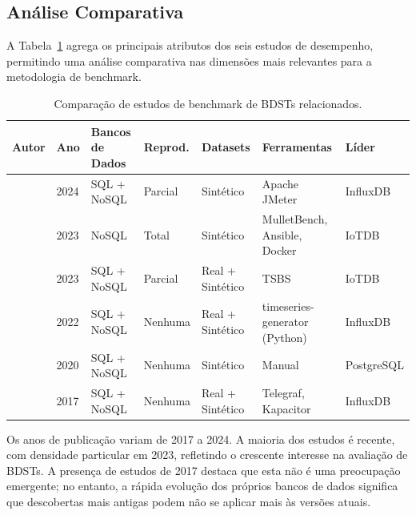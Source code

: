 \subsection{Análise Comparativa}

A Tabela~\ref{tab:related} agrega os principais atributos dos seis estudos de desempenho,
permitindo uma análise comparativa nas dimensões mais relevantes para a metodologia de
benchmark.

\begin{table}[t]
  \centering
  \footnotesize
  \caption{Comparação de estudos de benchmark de BDSTs relacionados.}
  \label{tab:related}
  \begin{tabular}{lllllll}
    \hline
    \textbf{Autor} & \textbf{Ano} & \textbf{Bancos de Dados} & \textbf{Reprod.} & \textbf{Datasets} & \textbf{Ferramentas} & \textbf{Líder} \\
    \hline
    \cite{lima2024avaliando}       & 2024 & SQL + NoSQL & Parcial & Sintético          & Apache JMeter                 & InfluxDB \\
    \cite{pereira2023mulletbench}  & 2023 & NoSQL       & Total   & Sintético          & MulletBench, Ansible, Docker  & IoTDB    \\
    \cite{wang2023iotdb}           & 2023 & SQL + NoSQL & Parcial & Real + Sintético   & TSBS                          & IoTDB    \\
    \cite{shah2022performance}     & 2022 & SQL + NoSQL & Nenhuma & Real + Sintético   & timeseries-generator (Python) & InfluxDB \\
    \cite{grzesik2020comparative}  & 2020 & SQL + NoSQL & Nenhuma & Sintético          & Manual                        & PostgreSQL \\
    \cite{naqvi2017influxdb}       & 2017 & SQL + NoSQL & Nenhuma & Real + Sintético   & Telegraf, Kapacitor            & InfluxDB \\
    \hline
  \end{tabular}
\end{table}

Os anos de publicação variam de 2017 a 2024. A maioria dos estudos é recente, com densidade
particular em 2023, refletindo o crescente interesse na avaliação de BDSTs. A presença de
estudos de 2017 destaca que esta não é uma preocupação emergente; no entanto, a rápida evolução
dos próprios bancos de dados significa que descobertas mais antigas podem não se aplicar mais às
versões atuais.

